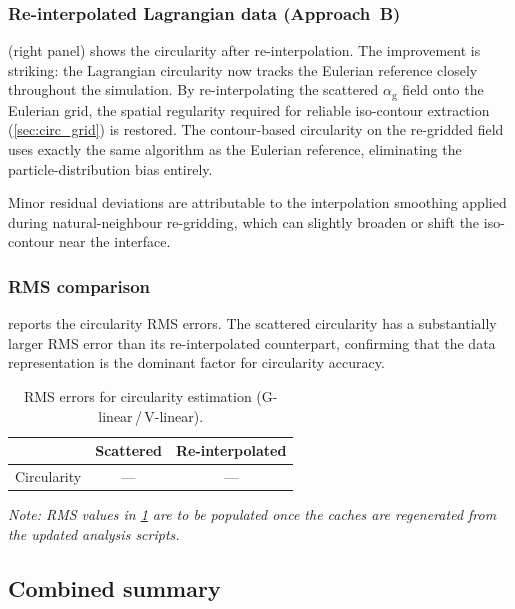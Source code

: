 \documentclass[11pt,a4paper]{article}
\newcommand{\alphag}{\alpha_{\mathrm{g}}}
\begin{document}
\subsubsection{Re-interpolated Lagrangian data (Approach~B)}

 (right panel) shows the circularity after re-interpolation.
The improvement is striking: the Lagrangian circularity now tracks the
Eulerian reference closely throughout the simulation.  By re-interpolating
the scattered $\alphag$ field onto the Eulerian grid, the spatial regularity
required for reliable iso-contour extraction (\cref{sec:circ_grid}) is
restored.  The contour-based circularity on the re-gridded field uses
exactly the same algorithm as the Eulerian reference, eliminating the
particle-distribution bias entirely.

Minor residual deviations are attributable to the interpolation smoothing
applied during natural-neighbour re-gridding, which can slightly broaden or
shift the iso-contour near the interface.


\subsubsection{RMS comparison}

 reports the circularity RMS errors.  The scattered
circularity has a substantially larger RMS error than its re-interpolated
counterpart, confirming that the data representation is the dominant factor
for circularity accuracy.

\begin{table}[ht]
\centering
\caption{RMS errors for circularity estimation (G-linear\,/\,V-linear).}
\label{tab:rms_circ}
\begin{tabular}{l cc}
  \toprule
  & \textbf{Scattered} & \textbf{Re-interpolated} \\
  \midrule
  Circularity & --- & --- \\
  \bottomrule
\end{tabular}
\end{table}

\noindent
\textit{Note: RMS values in \cref{tab:rms_circ} are to be populated once
the caches are regenerated from the updated analysis scripts.}


\subsection{Combined summary}\label{sec:summary_findings}
\end{document}
